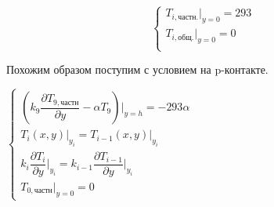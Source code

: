 \documentclass[a4paper,12pt]{article}
\begin{document}
	\begin{equation}
		\begin{cases}
			T_{i,\text{частн.}} \bigg|_{y=0} = 293 \\
			T_{i, \text{общ.}}\bigg|_{y=0} = 0\\
		\end{cases}
	\end{equation}
	
	\quad Похожим образом поступим с условием на p-контакте. 
	
	\begin{center}
		$\begin{cases}
			\left(k_9 \dfrac{\partial T_{9, \text{частн}}}{\partial y} - \alpha T_9\right)\bigg|_{y=h} = -293\alpha \\
			T_i (x, y)\bigg|_{y_i} = T_{i-1} (x, y)\bigg|_{y_i} \\
			k_i \dfrac{\partial T_i}{\partial y} \bigg|_{y_i} = k_{i-1} \dfrac{\partial T_{i-1}}{\partial y}\bigg|_{y_i} \\
			T_{0, \text{частн}}\bigg|_{y=0} = 0
		\end{cases}$
	\end{center}
	
\end{document}
